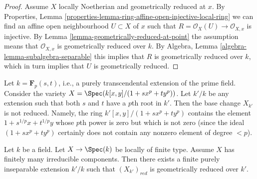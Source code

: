 \begin{proof}
Assume $X$ locally Noetherian and geometrically reduced at $x$.
By Properties, Lemma
\ref{properties-lemma-ring-affine-open-injective-local-ring}
we can find an affine open neighbourhood $U \subset X$ of $x$ such that
$R = \mathcal{O}_X(U) \to \mathcal{O}_{X, x}$
is injective. By
Lemma \ref{lemma-geometrically-reduced-at-point} the assumption
means that $\mathcal{O}_{X, x}$ is geometrically reduced over $k$.
By Algebra, Lemma \ref{algebra-lemma-subalgebra-separable}
this implies that $R$ is geometrically reduced over $k$, which
in turn implies that $U$ is geometrically reduced.
\end{proof}

\begin{example}
\label{example-not-geometrically-reduced}
Let $k = \mathbf{F}_p(s, t)$, i.e., a purely transcendental extension
of the prime field. Consider the variety
$X = \Spec(k[x, y]/(1 + sx^p + ty^p))$.
Let $k'/k$ be any extension such that
both $s$ and $t$ have a $p$th root in $k'$.
Then the base change $X_{k'}$ is not reduced.
Namely, the ring $k'[x, y]/(1 + s x^p + ty^p)$ contains the element
$1 + s^{1/p}x + t^{1/p}y$ whose $p$th power is zero but
which is not zero (since the ideal $(1 + sx^p + ty^p)$ certainly
does not contain any nonzero element of degree $< p$).
\end{example}

\begin{lemma}
\label{lemma-finite-extension-geometrically-reduced}
Let $k$ be a field.
Let $X \to \Spec(k)$ be locally of finite type.
Assume $X$ has finitely many irreducible components.
Then there exists a finite purely inseparable extension $k'/k$
such that $(X_{k'})_{red}$ is geometrically reduced over $k'$.
\end{lemma}


